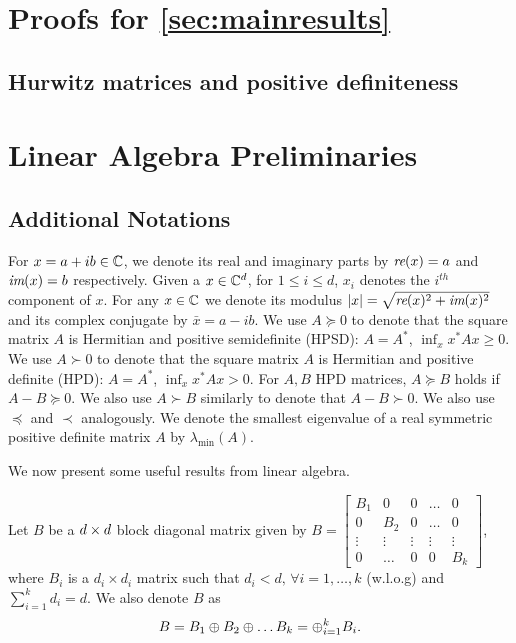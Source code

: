 \appendix

\section{Proofs for \cref{sec:mainresults}}
\subsection{Hurwitz matrices and positive definiteness}
\label{sec:hurpd}
\iffalse
\section{Linear Algebra Preliminaries}\label{sec:appendix}
\subsection{Additional Notations}\label{sec:addnot}
For $x=a+i b\in \mathbb{C}$, we denote its real and imaginary parts by $\emph{re}(x)=a$ and $\emph{im}(x)=b$ respectively. Given a $x\in \mathbb{C}^d$, for $1\leq i \leq d$, $x_i$ denotes the $i^{th}$ component of $x$.
For any $x\in \mathbb{C}$ we denote its modulus $\left|x\right|=\sqrt{\emph{re}(x)^2+\emph{im}(x)^2}$ and its complex conjugate by $\bar{x}=a-ib$.
We use $A\succeq 0$ to denote that the
square matrix $A$ is Hermitian and positive semidefinite (HPSD):
$A = A^*$, $\inf_x x^* A x\ge 0$. We use $A\succ 0$ to denote that the square matrix $A$ is Hermitian and positive definite (HPD): $A=A^*$, $\inf_x x^* A x > 0$.
For $A,B$ HPD matrices, $A\succeq B$ holds if $A-B\succeq 0$.
We also use $A\succ B$ similarly to denote that $A-B \succ 0$.
We also use $\preceq$ and $\prec$ analogously. We denote the smallest eigenvalue of a real symmetric positive definite matrix $A$ by $\lambda_{\min}(A)$.\par
We now present some useful results from linear algebra.

Let $B$ be a $d \times d$ block diagonal matrix given by $B=\begin{bmatrix} B_1 &0 &0 &\ldots &0 \\ 0 &B_2 &0 &\ldots &0  \\ \vdots &\vdots &\vdots &\vdots &\vdots \\ 0 &\ldots &0 &0 &B_k \end{bmatrix}$, where $B_i$ is a $d_i \times d_i$ matrix such that $d_i<d,\,\forall i=1,\ldots,k$ (w.l.o.g) and $\sum_{i=1}^k d_i=d$. We also denote $B$ as
\begin{align*}
B=B_1 \oplus B_2 \oplus \ldots B_k=\oplus_{i=1}^k B_i.
\end{align*}

